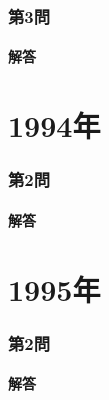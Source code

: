 \documentclass[a4paper,11pt]{ltjsarticle}
\begin{document}
\section*{第3問}

\subsection*{解答}

\clearpage

\part*{1994年}
\section*{第2問}

\subsection*{解答}

\clearpage

\part*{1995年}
\section*{第2問}

\subsection*{解答}

\clearpage
\end{document}
